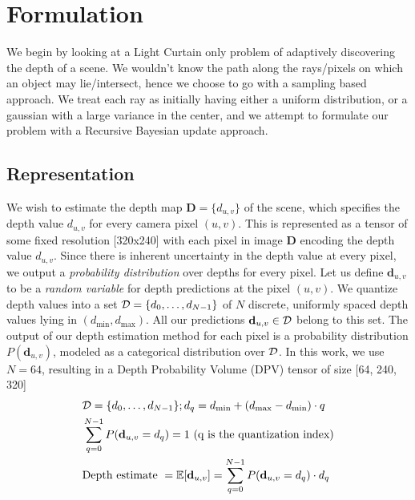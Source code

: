 
\section{Formulation}

\newcommand{\DD}{\mathbf{D}}
\newcommand{\dd}{\mathbf{d}}

We begin by looking at a Light Curtain only problem of adaptively discovering the depth of a scene. We wouldn't know the path along the rays/pixels on which an object may lie/intersect, hence we choose to go with a sampling based approach. We treat each ray as initially having either a uniform distribution, or a gaussian with a large variance in the center, and we attempt to formulate our problem with a Recursive Bayesian update approach.

\subsection{Representation}

\smallskip
We wish to estimate the depth map $\DD = \{d_{u, v}\}$ of the scene, which specifies the depth value $d_{u, v}$ for every camera pixel $(u, v)$. This is represented as a tensor of some fixed resolution [320x240] with each pixel in image $\DD$ encoding the depth value $d_{u,v}$. Since there is inherent uncertainty in the depth value at every pixel, we output a \textit{probability distribution} over depths for every pixel. Let us define $\dd_{u,v}$ to be a \textit{random variable} for depth predictions at the pixel $(u, v)$. We quantize depth values into a set $\mathcal{D} = \{d_0, \dots, d_{N-1}\}$ of $N$ discrete, uniformly spaced depth values lying in $(d_\text{min}, d_\text{max})$. All our predictions $\dd_{u, v} \in \D$ belong to this set. The output of our depth estimation method for each pixel is a probability distribution $P(\dd_{u, v})$, modeled as a categorical distribution over $\mathcal{D}$. In this work, we use $N=64$, resulting in a Depth Probability Volume (DPV) tensor of size [64, 240, 320]
\begin{align}
   &\D=\{d_0, \dots, d_{N-1}\}; d_{q}=d_\text{min}+(d_\text{max}-d_\text{min}) \cdot q
   \label{eq:d_candi}
   \\
   &\sum_{q=0}^{N-1} P(\dd_{u,v} = d_q) =1 \ \text{(q is the quantization index)}
   \label{eq:depth_dist}\\
   &\text{Depth estimate } = \mathbb{E} [ \dd_{u,v}] = \sum_{q=0}^{N-1} P(\dd_{u,v}=d_q)\cdot d_q
\end{align}

